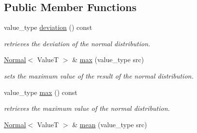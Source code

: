 \subsection*{Public Member Functions}
\begin{DoxyCompactItemize}
\item 
\hypertarget{classhryky_1_1random_1_1distribution_1_1_normal_a421514c36ee40e90a9de30917ca6af08}{value\-\_\-type \hyperlink{classhryky_1_1random_1_1distribution_1_1_normal_a421514c36ee40e90a9de30917ca6af08}{deviation} () const }\label{classhryky_1_1random_1_1distribution_1_1_normal_a421514c36ee40e90a9de30917ca6af08}

\begin{DoxyCompactList}\small\item\em retrieves the deviation of the normal distribution. \end{DoxyCompactList}\item 
\hypertarget{classhryky_1_1random_1_1distribution_1_1_normal_aef11b7363a00e38dee7a7a751af8666f}{\hyperlink{classhryky_1_1random_1_1distribution_1_1_normal}{Normal}$<$ Value\-T $>$ \& \hyperlink{classhryky_1_1random_1_1distribution_1_1_normal_aef11b7363a00e38dee7a7a751af8666f}{max} (value\-\_\-type src)}\label{classhryky_1_1random_1_1distribution_1_1_normal_aef11b7363a00e38dee7a7a751af8666f}

\begin{DoxyCompactList}\small\item\em sets the maximum value of the result of the normal distribution. \end{DoxyCompactList}\item 
\hypertarget{classhryky_1_1random_1_1distribution_1_1_normal_a1b4b4d1c1b4b025b3a8f878365c4ece9}{value\-\_\-type \hyperlink{classhryky_1_1random_1_1distribution_1_1_normal_a1b4b4d1c1b4b025b3a8f878365c4ece9}{max} () const }\label{classhryky_1_1random_1_1distribution_1_1_normal_a1b4b4d1c1b4b025b3a8f878365c4ece9}

\begin{DoxyCompactList}\small\item\em retrieves the maximum value of the normal distribution. \end{DoxyCompactList}\item 
\hypertarget{classhryky_1_1random_1_1distribution_1_1_normal_acc11e24dbfb6d8250aea4400e84e7d5a}{\hyperlink{classhryky_1_1random_1_1distribution_1_1_normal}{Normal}$<$ Value\-T $>$ \& \hyperlink{classhryky_1_1random_1_1distribution_1_1_normal_acc11e24dbfb6d8250aea4400e84e7d5a}{mean} (value\-\_\-type src)}\label{classhryky_1_1random_1_1distribution_1_1_normal_acc11e24dbfb6d8250aea4400e84e7d5a}


\end{DoxyCompactItemize}

